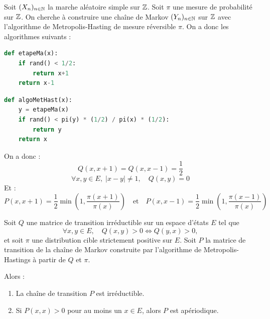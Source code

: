 \begin{example}
    Soit $(X_n)_{n \in \mathbb{N}}$ la marche aléatoire simple sur $\mathbb{Z}$. Soit $ \pi$ une mesure de probabilité sur $ \mathbb{Z}$. 
    On cherche à construire une chaîne de Markov $(Y_n)_{n \in \mathbb{N}}$ sur $\mathbb{Z}$ avec l'algorithme de Metropolis-Hasting 
    de mesure réversible $ \pi$. On a donc les algorithmes suivants : 

    \begin{center}
        \begin{minipage}{0.45\textwidth}
            \begin{lstlisting}[language=Python]
def etapeMa(x): 
    if rand() < 1/2: 
        return x+1
    return x-1
            \end{lstlisting}
        \end{minipage}
        \hfill 
        \begin{minipage}{0.45\textwidth}
            \begin{lstlisting}[language=Python]
def algoMetHast(x): 
    y = etapeMa(x)
    if rand() < pi(y) * (1/2) / pi(x) * (1/2): 
        return y 
    return x
            \end{lstlisting}
        \end{minipage}
    \end{center}

    On a donc : 
        $$ Q(x,x+1) = Q(x,x-1) = \frac{1}{2} $$ 
        $$ \forall x,y \in E, \; |x-y| \not = 1, \quad Q(x,y) = 0 $$ 
    Et : 
        $$ P(x,x+1) = \frac{1}{2} \min \left( 1, \frac{ \pi(x+1)}{ \pi(x)}  \right) \quad \text{et} \quad P(x, x-1) = \frac{1}{2} \min \left(1, \frac{ \pi(x-1)}{ \pi(x)} \right) $$
\end{example}

\begin{prop}
    Soit $Q$ une matrice de transition irréductible sur un espace d'états $E$ tel que
        $$ \forall x, y \in E, \quad Q(x,y) > 0 \iff Q(y,x) > 0, $$
    et soit $\pi$ une distribution cible strictement positive sur $E$.  
    Soit $P$ la matrice de transition de la chaîne de Markov construite par l'algorithme de Metropolis-Hastings à partir de $Q$ et $\pi$.  

    Alors :
        \begin{enumerate}[label=\roman*)]
            \item La chaîne de transition $P$ est irréductible.
            \item Si $P(x,x) > 0$ pour au moins un $x \in E$, alors $P$ est apériodique.
        \end{enumerate}
\end{prop}

